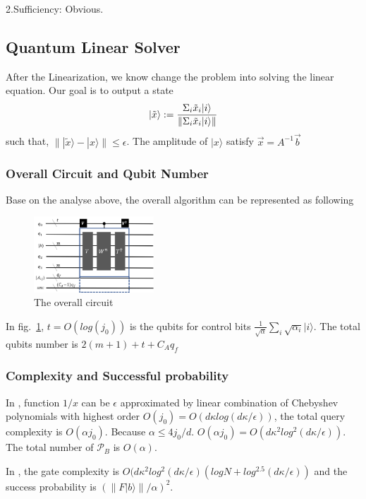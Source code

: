 \documentclass[%
 reprint,
 amsmath,amssymb,
pra,
]{revtex4-1}
\begin{document}
\begin{itemize}
2.Sufficiency: Obvious.

\subsection{Quantum Linear Solver}

After the Linearization, we know change the problem into solving the linear
equation. Our goal is to output a state 
\begin{equation}
|\tilde{x}\rangle:=\frac{\Sigma_i \tilde{x}_i|i\rangle}
{\lVert \Sigma_i \tilde{x}_i |i\rangle\rVert}\notag
\end{equation}
such that, $\lVert |\tilde{x}\rangle-|x\rangle\rVert\leqslant\epsilon$. 
The amplitude of $|x\rangle$ satisfy $\vec{x}=A^{-1}\vec{b}$

\subsubsection{Overall Circuit and Qubit Number}
Base on the analyse above, the overall algorithm can be represented as 
following
\begin{figure}[htbp]
\centering
\includegraphics[width=0.4\textwidth]{Fig/overall}
\caption{The overall circuit}
\label{o}
\end{figure}

In fig.~\ref{o}, $t=O(log(j_0))$ is the qubits for control bits  $\frac{1}
{\sqrt{\alpha}}\sum_i\sqrt{\alpha_i}|i\rangle$. The total qubits number is $2(m+1)+t+C_Aq_f$

\subsubsection{Complexity and Successful probability}
In \cite{doi:10.1137/16M1087072}, function $1/x$ can be $\epsilon$ approximated by
linear combination of Chebyshev polynomials with highest order 
$O(j_0)=O(d\kappa log(d\kappa/\epsilon))$, the total
query complexity is $O(\alpha j_0)$. Because $\alpha\leqslant 4j_0/d$.
$O(\alpha j_0)=O(d\kappa^2log^2(d\kappa/\epsilon))$. The total number of 
$\mathcal{P}_B$ is $O(\alpha)$.

In \cite{7354428}, the gate complexity is $O(d\kappa^2log^2(d\kappa/
\epsilon)(logN+log^{2.5}(d\kappa/\epsilon))$
and the success probability is 
$(\lVert F|b\rangle\rVert/\alpha)^2$. 


\end{itemize}
\end{document}
